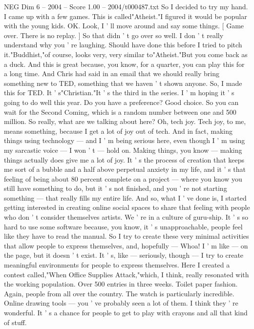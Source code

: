 \begin{textsample}{NEG Dim 6 – 2004 – Score 1.00 – 2004/t000487.txt}
So I decided to try my hand.
I came up with a few games.
This is called"Atheist."I figured it would be popular with the young kids.
OK.
Look, I ' ll move around and say some things. [ Game over.
There is no replay. ] So that didn ' t go over so well.
I don ' t really understand why you ' re laughing.
Should have done this before I tried to pitch it."Buddhist,"of course, looks very, very similar to"Atheist."But you come back as a duck.
And this is great because, you know, for a quarter, you can play this for a long time.
And Chris had said in an email that we should really bring something new to TED, something that we haven ' t shown anyone.
So, I made this for TED.
It ' s"Christian."It ' s the third in the series.
I ' m hoping it ' s going to do well this year.
Do you have a preference?
Good choice.
So you can wait for the Second Coming, which is a random number between one and 500 million.
So really, what are we talking about here?
Oh, tech joy.
Tech joy, to me, means something, because I get a lot of joy out of tech.
And in fact, making things using technology — and I ' m being serious here, even though I ' m using my sarcastic voice — I won ' t — hold on.
Making things, you know — making things actually does give me a lot of joy.
It ' s the process of creation that keeps me sort of a bubble and a half above perpetual anxiety in my life, and it ' s that feeling of being about 80 percent complete on a project — where you know you still have something to do, but it ' s not finished, and you ' re not starting something — that really fills my entire life.
And so, what I ' ve done is, I started getting interested in creating online social spaces to share that feeling with people who don ' t consider themselves artists.
We ' re in a culture of guru-ship.
It ' s so hard to use some software because, you know, it ' s unapproachable, people feel like they have to read the manual.
So I try to create these very minimal activities that allow people to express themselves, and, hopefully — Whoa!
I ' m like — on the page, but it doesn ' t exist.
It ' s, like — seriously, though — I try to create meaningful environments for people to express themselves.
Here I created a contest called,"When Office Supplies Attack,"which, I think, really resonated with the working population.
Over 500 entries in three weeks.
Toilet paper fashion.
Again, people from all over the country.
The watch is particularly incredible.
Online drawing tools — you ' ve probably seen a lot of them.
I think they ' re wonderful.
It ' s a chance for people to get to play with crayons and all that kind of stuff.

\end{textsample}

